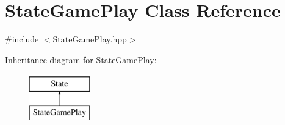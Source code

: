 \hypertarget{class_state_game_play}{\section{State\-Game\-Play Class Reference}
\label{class_state_game_play}
}


{\ttfamily \#include $<$State\-Game\-Play.\-hpp$>$}

Inheritance diagram for State\-Game\-Play\-:\begin{figure}[H]
\begin{center}
\leavevmode
\includegraphics[height=2.000000cm]{class_state_game_play}
\end{center}
\end{figure}
